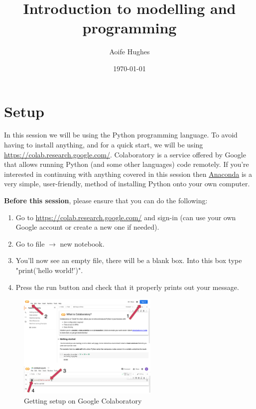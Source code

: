 \documentclass[12pt]{article}
\title{Introduction to modelling and programming}
\author{Aoife Hughes}
\date{\today}
\begin{document}
\maketitle

\section{Setup}


In this session we will be using the Python programming language. To avoid having to install anything, and for a quick start, we will be using \url{https://colab.research.google.com/}. Colaboratory is a service offered by Google that allows running Python (and some other languages) code remotely. If you're interested in continuing with anything covered in this session then \href{https://www.anaconda.com}{Anaconda} is a very simple, user-friendly, method of installing Python onto your own computer. 

\textbf{Before this session}, please ensure that you can do the following: 

\begin{enumerate}
    \item Go to \url{https://colab.research.google.com/} and sign-in (can use your own Google account or create a new one if needed).
    \item Go to file $\rightarrow$ new notebook.
    \item You'll now see an empty file, there will be a blank box. Into this box type "print('hello world!')".
    \item Press the run button and check that it properly prints out your message. 
\end{enumerate}

\begin{figure}[!h]
    \centering
    \includegraphics[width=0.6\textwidth]{./figures/ssIM1.png}
    \caption{Getting setup on Google Colaboratory}
\end{figure}
\end{document}
